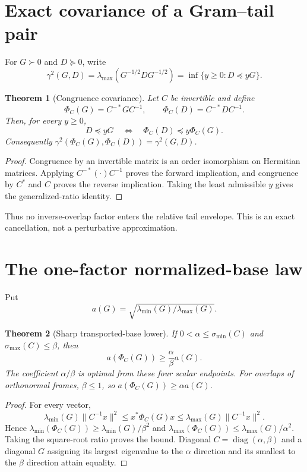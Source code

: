 \documentclass[12pt]{article}
\newtheorem{theorem}{Theorem}
\begin{document}
\section{Exact covariance of a Gram--tail pair}
For $G\succ0$ and $D\succeq0$, write
\[
 \gamma^2(G,D)=\lambda_{\max}(G^{-1/2}DG^{-1/2})
 =\inf\{y\geq0:D\preceq yG\}.
\]

\begin{theorem}[Congruence covariance]\label{thm:covariance}
Let $C$ be invertible and define
\[
 \Phi_C(G)=C^{-*}GC^{-1},\qquad
 \Phi_C(D)=C^{-*}DC^{-1}.
\]
Then, for every $y\geq0$,
\[
 D\preceq yG\quad\Longleftrightarrow\quad
 \Phi_C(D)\preceq y\Phi_C(G).
\]
Consequently $\gamma^2(\Phi_C(G),\Phi_C(D))=\gamma^2(G,D)$.
\end{theorem}
\begin{proof}
Congruence by an invertible matrix is an order isomorphism on Hermitian
matrices.  Applying $C^{-*}(\cdot)C^{-1}$ proves the forward implication,
and congruence by $C^*$ and $C$ proves the reverse implication.  Taking the
least admissible $y$ gives the generalized-ratio identity.
\end{proof}

Thus no inverse-overlap factor enters the relative tail envelope.  This is
an exact cancellation, not a perturbative approximation.

\section{The one-factor normalized-base law}
Put
\[
 a(G)=\sqrt{\lambda_{\min}(G)/\lambda_{\max}(G)}.
\]

\begin{theorem}[Sharp transported-base lower]\label{thm:base}
If $0<\alpha\leq\sigma_{\min}(C)$ and
$\sigma_{\max}(C)\leq\beta$, then
\[
 a(\Phi_C(G))\geq\frac{\alpha}{\beta}a(G).
\]
The coefficient $\alpha/\beta$ is optimal from these four scalar endpoints.
For overlaps of orthonormal frames, $\beta\leq1$, so
$a(\Phi_C(G))\geq\alpha a(G)$.
\end{theorem}
\begin{proof}
For every vector,
\[
 \lambda_{\min}(G)\|C^{-1}x\|^2
 \leq x^*\Phi_C(G)x
 \leq\lambda_{\max}(G)\|C^{-1}x\|^2.
\]
Hence $\lambda_{\min}(\Phi_C(G))\geq
\lambda_{\min}(G)/\beta^2$ and
$\lambda_{\max}(\Phi_C(G))\leq
\lambda_{\max}(G)/\alpha^2$.  Taking the square-root ratio proves the bound.
Diagonal $C=\operatorname{diag}(\alpha,\beta)$ and a diagonal $G$ assigning
its largest eigenvalue to the $\alpha$ direction and its smallest to the
$\beta$ direction attain equality.
\end{proof}
\end{document}
